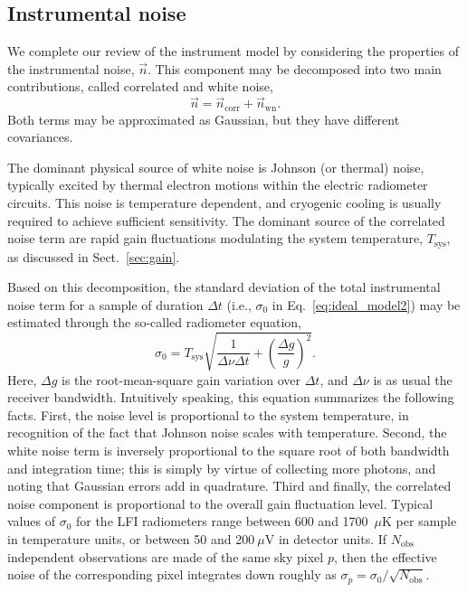 \documentclass[onecolumn]{aa}
\newcommand{\n}[0]{\vec{n}}
\begin{document}
\subsection{Instrumental noise}
\label{sec:noise}

We complete our review of the instrument model by considering the
properties of the instrumental noise, $\n$. This component may be
decomposed into two main contributions, called correlated and white
noise,
\begin{equation}
  \n = \n_{\mathrm{corr}} + \n_{\mathrm{wn}}.
  \label{eq:noise}
\end{equation}
Both terms may be approximated as Gaussian, but they have different
covariances.

The dominant physical source of white noise is Johnson (or thermal)
noise, typically excited by thermal electron motions within the
electric radiometer circuits. This noise is temperature dependent, and
cryogenic cooling is usually required to achieve sufficient
sensitivity. The dominant source of the correlated noise term are
rapid gain fluctuations modulating the system temperature,
$T_{\mathrm{sys}}$, as discussed in Sect.~\ref{sec:gain}.

Based on this decomposition, the standard deviation of the total
instrumental noise term for a sample of duration $\Delta t$ (i.e.,
$\sigma_0$ in Eq.~\eqref{eq:ideal_model2}) may be estimated through
the so-called radiometer equation,
\begin{equation}
\sigma_0 = T_{\mathrm{sys}} \sqrt{\frac{1}{\Delta\nu \Delta t} +
  \left(\frac{\Delta g}{g}\right)^2}.
\end{equation}
Here, $\Delta g$ is the root-mean-square gain variation over $\Delta
t$, and $\Delta \nu$ is as usual the receiver bandwidth. Intuitively
speaking, this equation summarizes the following facts. First, the
noise level is proportional to the system temperature, in recognition
of the fact that Johnson noise scales with temperature. Second, the
white noise term is inversely proportional to the square root of both
bandwidth and integration time; this is simply by virtue of collecting
more photons, and noting that Gaussian errors add in quadrature. Third
and finally, the correlated noise component is proportional to the
overall gain fluctuation level. Typical values of $\sigma_0$ for the
LFI radiometers range between 600 and 1700~$\mu\mathrm{K}$ per sample
in temperature units, or between 50 and 200$~\mu\mathrm{V}$ in
detector units. If $N_{\mathrm{obs}}$ independent observations are
made of the same sky pixel $p$, then the effective noise of the
corresponding pixel integrates down roughly as $\sigma_p = \sigma_0 /
\sqrt{N_{\mathrm{obs}}}$.
\end{document}
